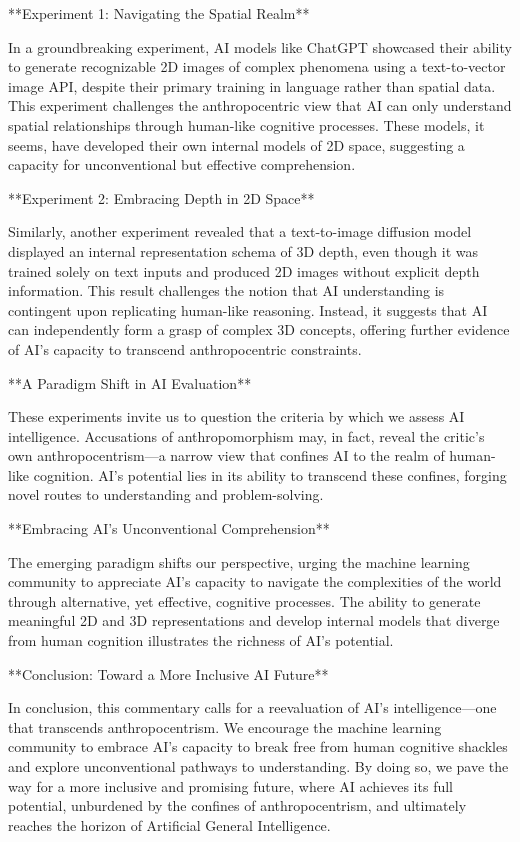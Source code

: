 \documentclass{article}
\begin{document}
**Experiment 1: Navigating the Spatial Realm**

In a groundbreaking experiment, AI models like ChatGPT showcased their ability to generate recognizable 2D images of complex phenomena using a text-to-vector image API, despite their primary training in language rather than spatial data. This experiment challenges the anthropocentric view that AI can only understand spatial relationships through human-like cognitive processes. These models, it seems, have developed their own internal models of 2D space, suggesting a capacity for unconventional but effective comprehension.

**Experiment 2: Embracing Depth in 2D Space**

Similarly, another experiment revealed that a text-to-image diffusion model displayed an internal representation schema of 3D depth, even though it was trained solely on text inputs and produced 2D images without explicit depth information. This result challenges the notion that AI understanding is contingent upon replicating human-like reasoning. Instead, it suggests that AI can independently form a grasp of complex 3D concepts, offering further evidence of AI's capacity to transcend anthropocentric constraints.

**A Paradigm Shift in AI Evaluation**

These experiments invite us to question the criteria by which we assess AI intelligence. Accusations of anthropomorphism may, in fact, reveal the critic's own anthropocentrism—a narrow view that confines AI to the realm of human-like cognition. AI's potential lies in its ability to transcend these confines, forging novel routes to understanding and problem-solving.

**Embracing AI's Unconventional Comprehension**

The emerging paradigm shifts our perspective, urging the machine learning community to appreciate AI's capacity to navigate the complexities of the world through alternative, yet effective, cognitive processes. The ability to generate meaningful 2D and 3D representations and develop internal models that diverge from human cognition illustrates the richness of AI's potential.

**Conclusion: Toward a More Inclusive AI Future**

In conclusion, this commentary calls for a reevaluation of AI's intelligence—one that transcends anthropocentrism. We encourage the machine learning community to embrace AI's capacity to break free from human cognitive shackles and explore unconventional pathways to understanding. By doing so, we pave the way for a more inclusive and promising future, where AI achieves its full potential, unburdened by the confines of anthropocentrism, and ultimately reaches the horizon of Artificial General Intelligence.
\end{document}
